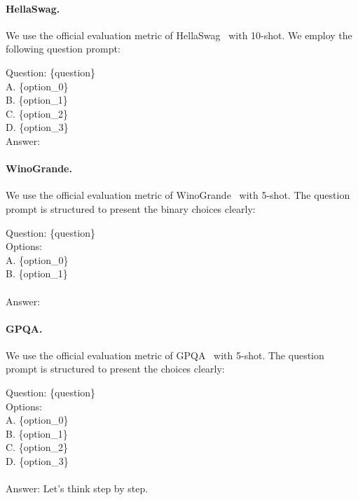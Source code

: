 \paragraph{HellaSwag.} We use the official evaluation metric of HellaSwag~\cite{zellers2019hellaswag} with 10-shot. We employ the following question prompt:

\begin{MyBox}{}

    Question: \{question\}\\
    A. \{option\_0\}\\
    B. \{option\_1\}\\
    C. \{option\_2\}\\
    D. \{option\_3\}\\
    Answer:
\end{MyBox}

\paragraph{WinoGrande.} We use the official evaluation metric of WinoGrande~\cite{sakaguchi2019winogrande} with 5-shot. The question prompt is structured to present the binary choices clearly:

\begin{MyBox}{}

    Question: \{question\}\\
    Options:\\
    A. \{option\_0\}\\
    B. \{option\_1\}\\
    \\
    Answer:
\end{MyBox}

\paragraph{GPQA.} We use the official evaluation metric of GPQA~\cite{rein2023gpqa} with 5-shot. The question prompt is structured to present the choices clearly:

\begin{MyBox}{}
\small
    Question: \{question\}\\
    Options:\\
    A. \{option\_0\}\\
    B. \{option\_1\}\\
    C. \{option\_2\}\\
    D. \{option\_3\}\\
    \\
    Answer: Let’s think step by step.
\end{MyBox}


